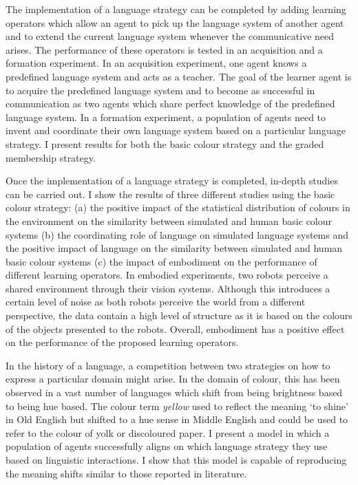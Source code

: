 The implementation of a language strategy can be completed by adding
learning operators which allow an agent to pick up the language system
of another agent and to extend the current language system whenever
the communicative need arises. The performance of these operators is
tested in an acquisition and a formation experiment. In an acquisition
experiment, one agent knows a predefined language system and acts as a
teacher. The goal of the learner agent is to acquire the predefined
language system and to become as successful in communication as two
agents which share perfect knowledge of the predefined language
system. In a formation experiment, a population of agents need to
invent and coordinate their own language system based on a particular
language strategy. I present results for both the basic colour
strategy and the graded membership strategy.

Once the implementation of a language strategy is completed, in-depth
studies can be carried out. I show the results of three different
studies using the basic colour strategy: (a) the positive impact of
the statistical distribution of colours in the environment on the
similarity between simulated and human basic colour systems (b) the
coordinating role of language on simulated language systems and the
positive impact of language on the similarity between simulated and
human basic colour systems (c) the impact of embodiment on the
performance of different learning operators. In embodied experiments,
two robots perceive a shared environment through their vision
systems. Although this introduces a certain level of noise as both
robots perceive the world from a different perspective, the data
contain a high level of structure as it is based on the colours of
the objects presented to the robots. Overall, embodiment has a
positive effect on the performance of the proposed learning operators.

In the history of a language, a competition between two strategies on
how to express a particular domain might arise. In the domain of
colour, this has been observed in a vast number of languages which
shift from being brightness based to being hue based. The colour term
\textit{yellow} used to reflect the meaning `to shine' in Old English but
shifted to a hue sense in Middle English and could be used to refer to
the colour of yolk or discoloured paper. I present a model in which a
population of agents successfully aligns on which language strategy
they use based on linguistic interactions. I show that this model is \enlargethispage{\baselineskip}
capable of reproducing the meaning shifts similar to those reported in
literature.

